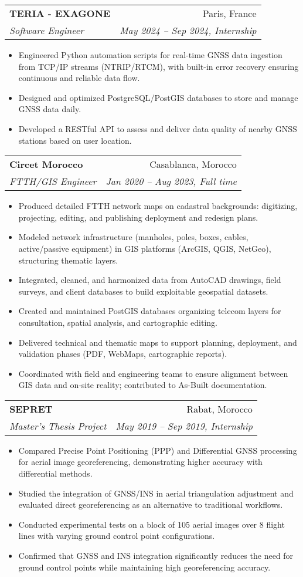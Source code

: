\documentclass[letterpaper,11pt]{article}
\makeatletter
\newcommand{\resumeItem}[1]{
  \item\small{
    {#1 \vspace{-2pt}}
  }
}
\newcommand{\resumeSubheading}[4]{
  \vspace{-2pt}\item
    \begin{tabular*}{0.97\textwidth}[t]{l@{\extracolsep{\fill}}r}
      \textbf{#1} & #2 \\
      \textit{\small#3} & \textit{\small #4} \\
    \end{tabular*}\vspace{-7pt}
}
\newcommand{\resumeItemListStart}{\begin{itemize}}
\newcommand{\resumeItemListEnd}{\end{itemize}\vspace{-5pt}}
\makeatother
\begin{document}
  \resumeSubheading
    {TERIA - EXAGONE}{Paris, France}
    {Software Engineer}{May 2024 -- Sep 2024, Internship}
    \resumeItemListStart
      \resumeItem{Engineered Python automation scripts for real-time GNSS data ingestion from TCP/IP streams (NTRIP/RTCM), with built-in error recovery ensuring continuous and reliable data flow.}
      \resumeItem{Designed and optimized PostgreSQL/PostGIS databases to store and manage GNSS data daily.}
      \resumeItem{Developed a RESTful API to assess and deliver data quality of nearby GNSS stations based on user location.}
    \resumeItemListEnd

  \resumeSubheading
    {Circet Morocco}{Casablanca, Morocco}
    {FTTH/GIS Engineer}{Jan 2020 -- Aug 2023, Full time}
    \resumeItemListStart
      \resumeItem{Produced detailed FTTH network maps on cadastral backgrounds: digitizing, projecting, editing, and publishing deployment and redesign plans.}
      \resumeItem{Modeled network infrastructure (manholes, poles, boxes, cables, active/passive equipment) in GIS platforms (ArcGIS, QGIS, NetGeo), structuring thematic layers.}
      \resumeItem{Integrated, cleaned, and harmonized data from AutoCAD drawings, field surveys, and client databases to build exploitable geospatial datasets.}
      \resumeItem{Created and maintained PostGIS databases organizing telecom layers for consultation, spatial analysis, and cartographic editing.}
      \resumeItem{Delivered technical and thematic maps to support planning, deployment, and validation phases (PDF, WebMaps, cartographic reports).}
      \resumeItem{Coordinated with field and engineering teams to ensure alignment between GIS data and on-site reality; contributed to As-Built documentation.}
    \resumeItemListEnd

  \resumeSubheading
    {SEPRET}{Rabat, Morocco}
    {Master’s Thesis Project}{May 2019 -- Sep 2019, Internship}
    \resumeItemListStart
      \resumeItem{Compared Precise Point Positioning (PPP) and Differential GNSS processing for aerial image georeferencing, demonstrating higher accuracy with differential methods.}
      \resumeItem{Studied the integration of GNSS/INS in aerial triangulation adjustment and evaluated direct georeferencing as an alternative to traditional workflows.}
      \resumeItem{Conducted experimental tests on a block of 105 aerial images over 8 flight lines with varying ground control point configurations.}
      \resumeItem{Confirmed that GNSS and INS integration significantly reduces the need for ground control points while maintaining high georeferencing accuracy.}
    \resumeItemListEnd
\end{document}
